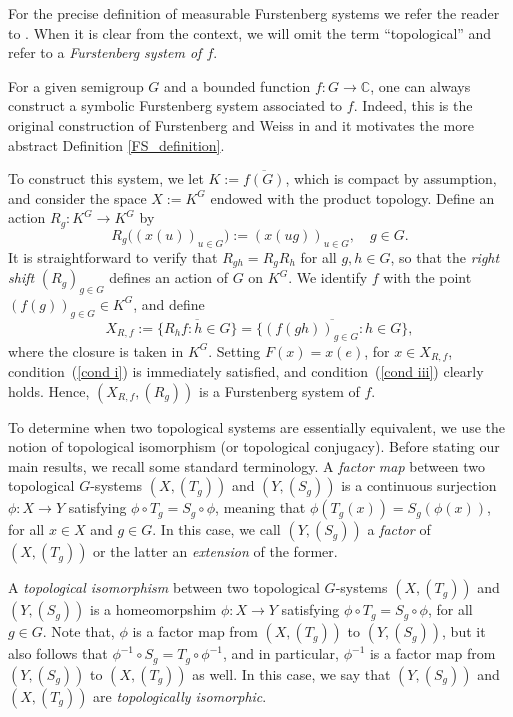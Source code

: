 \documentclass{amsart}
\numberwithin{equation}{section}
\theoremstyle{definition}
\theoremstyle{plain}
\begin{document}
For the precise definition of measurable Furstenberg 
systems we refer the reader to \cite[Definition 1.2]{Bergelson_Moragues}.
 When it is clear from the context, we will omit the term 
“topological” and refer to a \textit{Furstenberg system of $f$}. 

For a given semigroup $G$ and a bounded function 
$f : G \to \mathbb{C}$, one can
always construct a symbolic Furstenberg system associated
to $f$. Indeed, this is the original construction 
of Furstenberg and Weiss in \cite{Furstenberg_Weiss} and it motivates the 
more abstract Definition \ref{FS_definition}.

To construct this system, we let $K := \overline{f(G)}$, which is compact by assumption, and consider the space $X:=K^G$ endowed with the product topology. Define an action $R_g : K^G \to K^G$ by
\[
R_g\big( (x(u))_{u \in G} \big) := (x(ug))_{u \in G}, \quad g \in G.
\]
It is straightforward to verify that $R_{gh} = R_g R_h$ 
for all $g,h \in G$, 
so that the \textit{right shift} $(R_g)_{g \in G}$ 
defines an 
action of $G$ on $K^G$. We identify $f$ with the point $(f(g))_{g \in G} \in K^G$, and define
\[
X_{R,f} := \overline{\{ R_h f : h \in G \}} 
= \overline{\{ (f(gh))_{g \in G} : h \in G \}},
\]
where the closure is taken in $K^G$. Setting 
$F(x) = x(e)$, for $x\in X_{R,f}$, condition~(\ref{cond i}) is immediately satisfied, and condition~(\ref{cond iii}) clearly holds. Hence, 
$(X_{R,f}, (R_g))$ 
is a Furstenberg system of $f$.


To determine when two topological systems are essentially equivalent, we use the notion of topological isomorphism (or topological conjugacy). 
Before stating our main results, we recall some standard terminology.
A \textit{factor map} between two topological $G$-systems $(X,(T_g))$ and $(Y,(S_g))$ is a continuous surjection $\phi:X\to Y$ satisfying $\phi \circ T_g=S_g\circ \phi$, meaning that $\phi(T_g(x))=S_g(\phi(x))$, for all $x\in X$ and $g\in G$. In this case, we call $(Y,(S_g))$ a \textit{factor} of $(X,(T_g))$ or the latter an \textit{extension} of the former. 

A \textit{topological isomorphism} between two topological $G$-systems $(X,(T_g))$ and $(Y,(S_g))$ is a homeomorpshim $\phi:X\to Y$ satisfying $\phi \circ T_g=S_g\circ \phi$, for all $g\in G$. Note that, $\phi$ is a factor map from $(X,(T_g))$ to $(Y,(S_g))$, but it also follows that $\phi^{-1} \circ S_g=T_g\circ \phi^{-1}$, and in particular, $\phi^{-1}$ is a factor map from $(Y,(S_g))$ to $(X,(T_g))$ as well. In this case, we say that $(Y,(S_g))$ and $(X,(T_g))$ are \textit{topologically isomorphic}.
\end{document}
